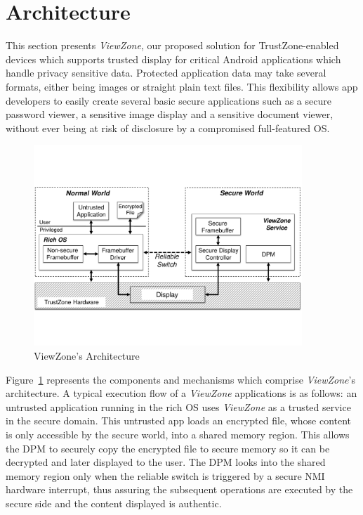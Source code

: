 
% 
% 
\section{Architecture}
\label{sec:architecture}

This section presents \emph{ViewZone}, our proposed solution for TrustZone-enabled devices which supports trusted display for critical Android applications which handle privacy sensitive data. Protected application data may take several formats, either being images or straight plain text files. This flexibility allows app developers to easily create several basic secure applications such as a secure password viewer, a sensitive image display and a sensitive document viewer, without ever being at risk of disclosure by a compromised full-featured OS.

\begin{figure}[t!]
	\centering
	\includegraphics[width=0.9\textwidth]{img/viewzone_architecture.pdf}
	\caption{ViewZone's Architecture}
	\label{fig:viewzone_architecture}
\end{figure}

Figure~\ref{fig:viewzone_architecture} represents the components and mechanisms which comprise \emph{ViewZone}'s architecture. A typical execution flow of a \emph{ViewZone} applications is as follows: an untrusted application running in the rich OS uses \emph{ViewZone} as a trusted service in the secure domain. This untrusted app loads an encrypted file, whose content is only accessible by the secure world, into a shared memory region. This allows the \ac{DPM} to securely copy the encrypted file to secure memory so it can be decrypted and later displayed to the user. The \ac{DPM} looks into the shared memory region only when the reliable switch is triggered by a secure \ac{NMI} hardware interrupt, thus assuring the subsequent operations are executed by the secure side and the content displayed is authentic.

